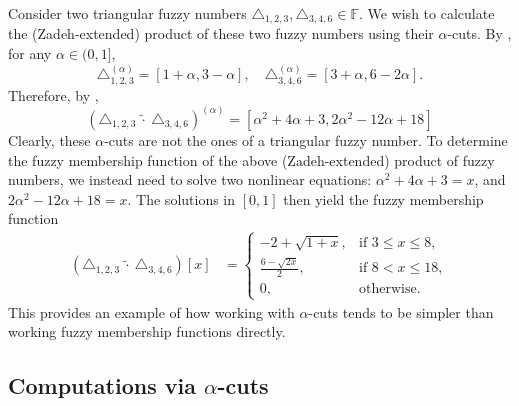 \documentclass[runningheads]{llncs}
\newcommand{\fuzznum}{\mathbb{F}} %
\begin{document}
\begin{example}
    Consider two triangular fuzzy numbers $\triangle_{1,2,3}, \triangle_{3,4,6}\in \fuzznum$. We wish to calculate the (Zadeh-extended) product of these two fuzzy numbers using their $\alpha$-cuts. By , for any $\alpha \in (0,1]$,
    $$
    \triangle^{(\alpha)}_{1,2,3} = [1+\alpha, 3-\alpha], \quad
    \triangle^{(\alpha)}_{3,4,6} = [3+\alpha, 6-2\alpha].
    $$
    Therefore, by ,  
    $$
    (\triangle_{1,2,3} \ \widetilde{\cdot} \ \triangle_{3,4,6})^{(\alpha)} = [\alpha^2 +4\alpha+3, 2\alpha^2-12\alpha+18]
    $$
    Clearly, these $\alpha$-cuts are not the ones of a triangular fuzzy number. To determine the fuzzy membership function of the above (Zadeh-extended) product of fuzzy numbers, we instead need to solve two nonlinear equations: $\alpha^2 +4\alpha+3=x$, and $2\alpha^2-12\alpha+18=x$. The solutions  in $[0,1]$ then yield the fuzzy membership function
    \begin{align}
    (\triangle_{1,2,3} \ \widetilde{\cdot} \ \triangle_{3,4,6})[x] &= 
    \begin{cases}
        -2 + \sqrt{1+x}, & \textrm{if } 3 \leq x \leq 8,\\
        \tfrac{6 - \sqrt{2x}}{2}, & \textrm{if } 8 < x \leq 18,\\
        0, & \text{otherwise}.
    \end{cases}
    \end{align}
    This provides an example of how working with $\alpha$-cuts tends to be simpler than working fuzzy membership functions directly.
\end{example}

\subsection{Computations via $\alpha$-cuts}\label{sec:BU_alpha_cuts}
\end{document}
